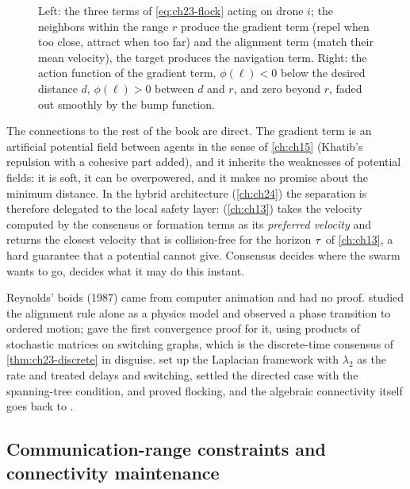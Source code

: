 \begin{figure}[tb]
  \centering
  \caption{Left: the three terms of \cref{eq:ch23-flock} acting on drone $i$;
  the neighbors within the range $r$ produce the gradient term (repel when
  too close, attract when too far) and the alignment term (match their mean
  velocity), the target produces the navigation term. Right: the action
  function of the gradient term, $\phi(\ell) < 0$ below the desired distance
  $d$, $\phi(\ell) > 0$ between $d$ and $r$, and zero beyond $r$, faded out
  smoothly by the bump function.}
  \label{fig:ch23-flocking}
\end{figure}

The connections to the rest of the book are direct. The gradient term is an
artificial potential field between agents in the sense of \cref{ch:ch15}
(Khatib's repulsion \cite{khatib1986realtime} with a cohesive part added), and
it inherits the weaknesses of potential fields: it is soft, it can be
overpowered, and it makes no promise about the minimum distance. In the hybrid
architecture (\cref{ch:ch24}) the separation is therefore delegated to the
local safety layer: \orca (\cref{ch:ch13}) takes the velocity computed by the
consensus or formation terms as its \emph{preferred velocity} and returns the
closest velocity that is collision-free for the \orca horizon $\tau$ of
\cref{ch:ch13}, a hard
guarantee that a potential cannot give. Consensus decides where the swarm
wants to go, \orca decides what it may do this instant.

\begin{historynote}
Reynolds' boids (1987) came from computer animation and had no proof.
\textcite{vicsek1995novel} studied the alignment rule alone as a physics model
and observed a phase transition to ordered motion; \textcite{jadbabaie2003coordination}
gave the first convergence proof for it, using products of stochastic matrices
on switching graphs, which is the discrete-time consensus of
\cref{thm:ch23-discrete} in disguise. \textcite{olfatisaber2004consensus} set
up the Laplacian framework with $\lambda_2$ as the rate and treated delays and
switching, \textcite{ren2005consensus} settled the directed case with the
spanning-tree condition, \textcite{olfatisaber2006flocking} and
\textcite{tanner2007flocking} proved flocking, and the algebraic connectivity
itself goes back to \textcite{fiedler1973algebraic}.
\end{historynote}

\subsection{Communication-range constraints and connectivity maintenance}
\label{sec:ch23-range}

